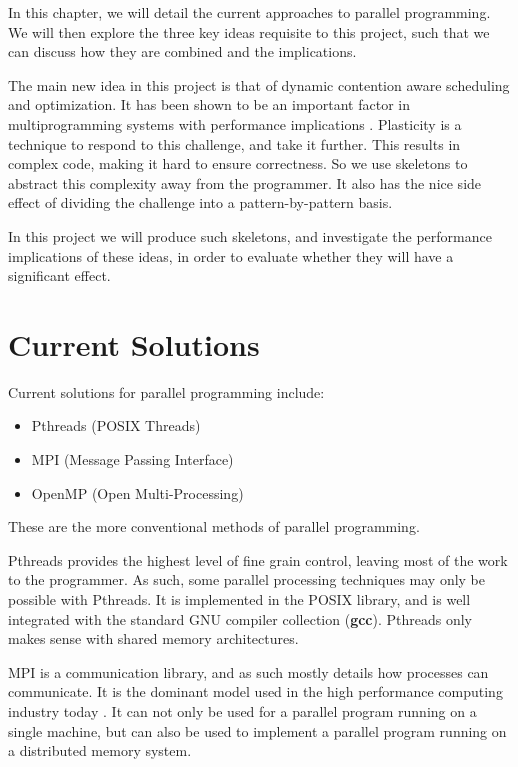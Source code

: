 
In this chapter, we will detail the current approaches to parallel programming. We will then explore the three key ideas requisite to this project, such that we can discuss how they are combined and the implications.

The main new idea in this project is that of dynamic contention aware scheduling and optimization. It has been shown to be an important factor in multiprogramming systems with performance implications \cite{lira}. Plasticity is a technique to respond to this challenge, and take it further. This results in complex code, making it hard to ensure correctness. So we use skeletons to abstract this complexity away from the programmer. It also has the nice side effect of dividing the challenge into a pattern-by-pattern basis.

In this project we will produce such skeletons, and investigate the performance implications of these ideas, in order to evaluate whether they will have a significant effect.



\section{Current Solutions}

Current solutions for parallel programming include:

\begin{itemize}
	\item Pthreads (POSIX Threads)
	\item MPI 	   (Message Passing Interface)
	\item OpenMP   (Open Multi-Processing)
\end{itemize}

These are the more conventional methods of parallel programming.

Pthreads provides the highest level of fine grain control, leaving most of the work to the programmer. As such, some parallel processing techniques may only be possible with Pthreads. It is implemented in the POSIX library, and is well integrated with the standard GNU compiler collection (\textbf{gcc}). Pthreads only makes sense with shared memory architectures.

MPI is a communication library, and as such mostly details how processes can communicate. It is the dominant model used in the high performance computing industry today \cite{mpi}. It can not only be used for a parallel program running on a single machine, but can also be used to implement a parallel program running on a distributed memory system.

